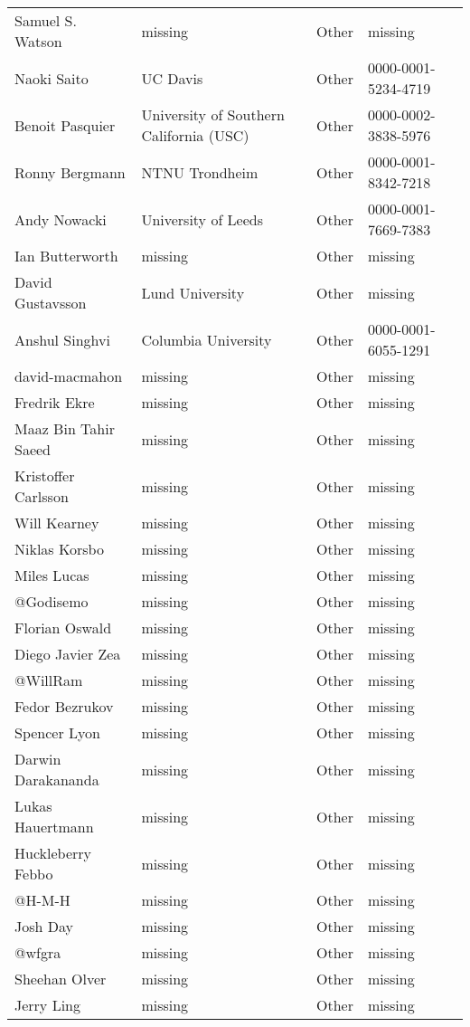\begin{longtable}{p{4cm}p{4cm}ll}
  Samuel S. Watson & missing & Other & missing \\
  Naoki Saito & UC Davis & Other & 0000-0001-5234-4719 \\
  Benoit Pasquier & University of Southern California (USC) & Other & 0000-0002-3838-5976 \\
  Ronny Bergmann & NTNU Trondheim & Other & 0000-0001-8342-7218 \\
  Andy Nowacki & University of Leeds & Other & 0000-0001-7669-7383 \\
  Ian Butterworth & missing & Other & missing \\
  David Gustavsson & Lund University & Other & missing \\
  Anshul Singhvi & Columbia University & Other & 0000-0001-6055-1291 \\
  david-macmahon & missing & Other & missing \\
  Fredrik Ekre & missing & Other & missing \\
  Maaz Bin Tahir Saeed & missing & Other & missing \\
  Kristoffer Carlsson & missing & Other & missing \\
  Will Kearney & missing & Other & missing \\
  Niklas Korsbo & missing & Other & missing \\
  Miles Lucas & missing & Other & missing \\
  @Godisemo & missing & Other & missing \\
  Florian Oswald & missing & Other & missing \\
  Diego Javier Zea & missing & Other & missing \\
  @WillRam & missing & Other & missing \\
  Fedor Bezrukov & missing & Other & missing \\
  Spencer Lyon & missing & Other & missing \\
  Darwin Darakananda & missing & Other & missing \\
  Lukas Hauertmann & missing & Other & missing \\
  Huckleberry Febbo & missing & Other & missing \\
  @H-M-H & missing & Other & missing \\
  Josh Day & missing & Other & missing \\
  @wfgra & missing & Other & missing \\
  Sheehan Olver & missing & Other & missing \\
  Jerry Ling & missing & Other & missing \\

\end{longtable}
